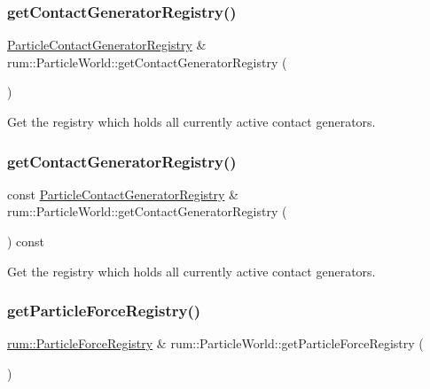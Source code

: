 \subsubsection{\texorpdfstring{get\+Contact\+Generator\+Registry()}{getContactGeneratorRegistry()}\hspace{0.1cm}{\footnotesize\ttfamily [1/2]}}
{\footnotesize\ttfamily \mbox{\hyperlink{classrum_1_1_particle_contact_generator_registry}{Particle\+Contact\+Generator\+Registry}} \& rum\+::\+Particle\+World\+::get\+Contact\+Generator\+Registry (\begin{DoxyParamCaption}{ }\end{DoxyParamCaption})}

Get the registry which holds all currently active contact generators. \mbox{\label{classrum_1_1_particle_world_a33326504cce2123d29b1aa6f333f01c9}} 
\subsubsection{\texorpdfstring{get\+Contact\+Generator\+Registry()}{getContactGeneratorRegistry()}\hspace{0.1cm}{\footnotesize\ttfamily [2/2]}}
{\footnotesize\ttfamily const \mbox{\hyperlink{classrum_1_1_particle_contact_generator_registry}{Particle\+Contact\+Generator\+Registry}} \& rum\+::\+Particle\+World\+::get\+Contact\+Generator\+Registry (\begin{DoxyParamCaption}{ }\end{DoxyParamCaption}) const}

Get the registry which holds all currently active contact generators. \mbox{\label{classrum_1_1_particle_world_a4a4bd01d1d53a12c1c8499a25df41a1d}} 
\subsubsection{\texorpdfstring{get\+Particle\+Force\+Registry()}{getParticleForceRegistry()}\hspace{0.1cm}{\footnotesize\ttfamily [1/2]}}
{\footnotesize\ttfamily \mbox{\hyperlink{classrum_1_1_particle_force_registry}{rum\+::\+Particle\+Force\+Registry}} \& rum\+::\+Particle\+World\+::get\+Particle\+Force\+Registry (\begin{DoxyParamCaption}{ }\end{DoxyParamCaption})}

